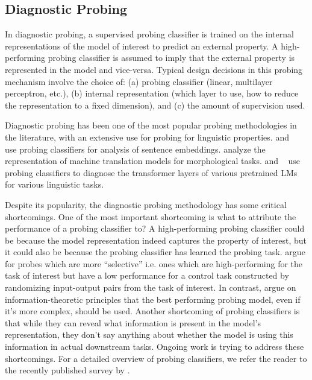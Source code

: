 \documentclass[12pt]{thesis-umich}[thesis]
\begin{document}
\subsection{Diagnostic Probing}
\label{sec:probing_classifier}
In diagnostic probing, a supervised probing classifier is trained on the internal representations of the model of interest to predict an external property. 
A high-performing probing classifier is assumed to imply that the external property is represented in the model and vice-versa. 
Typical design decisions in this probing mechanism involve the choice of: (a) probing classifier (linear, multilayer perceptron, etc.), (b) internal representation (which layer to use, how to reduce the representation to a fixed dimension), and (c) the amount of supervision used. 

Diagnostic probing has been one of the most popular probing methodologies in the literature, with an extensive use for probing for linguistic properties. 
\citet{ettinger-etal-2016-probing} and  ~\citet{adi17probing} use probing classifiers for analysis of sentence embeddings. \citet{belinkov-etal-2017-neural} analyze the representation of machine translation models for morphological tasks. \citet{liu-etal-2019-linguistic, tenney-etal-2019-bert} and ~\citet{tenney2019probing} use probing classifiers to diagnose the transformer layers of various pretrained LMs for various linguistic tasks.  
  




Despite its popularity, the diagnostic probing methodology has some critical shortcomings. 
One of the most important shortcoming is what to attribute the performance of a probing classifier to? 
A high-performing probing classifier could be because the model representation indeed captures the property of interest, but it could also be because the probing classifier has learned the probing task.  
\citet{hewitt-liang-2019-designing} argue for probes which are more ``selective'' i.e. ones which are high-performing for the task of interest but have a low performance for a control task constructed by randomizing  input-output pairs from the task of interest.  
In contrast, \citet{pimentel-etal-2020-information} argue on information-theoretic principles that the best performing probing model, even if it's more complex, should be used.  
Another shortcoming of probing classifiers is that while they can reveal what information is present in the model's representation, they don't say anything about whether the model is using this information in actual downstream tasks. 
Ongoing work is trying to address these shortcomings. 
For a detailed overview of probing classifiers, we refer the reader to the recently published survey by \citet{belinkov2022probing}. 
\end{document}
